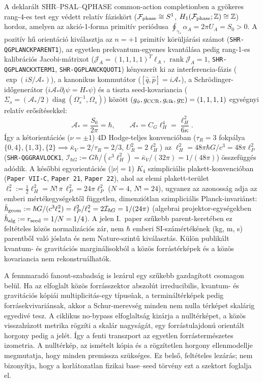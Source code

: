 \documentclass[12pt]{article}
\begin{document}
A deklarált SHR--PSAL--QPHASE common-action completionben a gyökeres rang-4-es
test egy védett relatív fáziskört ($\mathcal F_{\rm phase}\cong S^1$,
$H_1(\mathcal F_{\rm phase};\mathbb Z)\cong\mathbb Z$) hordoz, amelyen az
akció-1-forma primitív periódusa $\oint_{\gamma_*}\alpha_A=2\pi U_A=S_0>0$.
A pozitív hű orientáció kiválasztja az $n=+1$ primitív körüljárási számot
(\texttt{SHR-QGPLANCKPARENT1}), az egyetlen prekvantum-egyenes kvantálása pedig
rang-1-es kalibrációs Jacobi-mátrixot ($\mathcal J_A=(1,1,1,1)^T\ell_A$,
$\operatorname{rank}\mathcal J_A=1$, \texttt{SHR-QGPLANCKXTERM1},
\texttt{SHR-QGPLANCKQUOT1}) kényszerít ki az interferencia-fázis
($\exp(iS/\mathcal A_*)$), a kanonikus kommutátor ($[\hat q,\hat p]=i\mathcal A_*$),
a Schr\"odinger-időgenerátor ($i\mathcal A_*\partial_t\psi=H_*\psi$) és a tiszta
seed-kovariancia ($\Sigma_s=(\mathcal A_*/2)\operatorname{diag}(\Omega_s^{-1},\Omega_s)$)
között $(g_\phi,g_{\rm CCR},g_{\rm clk},g_\Sigma)=(1,1,1,1)$ egységnyi
relatív erősítésekkel:
\[
 \mathcal A_*=\frac{S_0}{2\pi}=\hbar,
 \qquad
 \mathcal A_*=C_G\ell_H^4=\frac{\ell_H^2}{6\kappa}.
\]
Így a kétorientációs ($\nu=\pm 1$) 4D Hodge-teljes konvencióban ($\tau_R=3$
fokpálya $\{0,4\},\{1,3\},\{2\}\implies\bar\kappa_V=2/\tau_R=2/3$,
$U_R^2=2\ell_H^2$) az $\ell_H^2=48\pi\hbar G/c^3=48\pi\ell_P^2$
(\texttt{SHR-QGGRAVLOCK1}, $\mathcal I_{\hbar G}:=G\hbar/(c^3\ell_H^2)=\bar\kappa_V/(32\pi)=1/(48\pi)$)
összefüggés adódik. A későbbi egyorientációs ($|\nu|=1$) $K_4$ szimpliciális
plakett-konvencióban (\texttt{Paper VII-C}, \texttt{Paper 21}, \texttt{Paper 22}),
ahol az elemi plakett-terület $\ell_*^2 := \frac{1}{2}\ell_H^2 = N!\,\pi\,\ell_P^2 = 24\pi\ell_P^2$
($N=4$, $N!=24$), ugyanez az azonosság adja az emberi mértékegységektől független,
dimenziótlan szimpliciális Planck-invariánst:
$\tilde\hbar_{\rm geom}:=\hbar G/(c^3\ell_*^2)=\ell_P^2/\ell_*^2=2\mathcal I_{\hbar G}=1/(24\pi)$
(algebrai projektor-egységekben $\tilde\hbar_{\rm alg}:=r_{\rm seed}=1/N=1/4$).
A jelen I.~paper szűkebb parent-keretében ez feltételes közös normalizációs zár,
nem $\hbar$ emberi SI-számértékének (kg, m, s) parentből való jóslata és nem
Nature-szintű kiválasztás.  Külön publikált kvantum- és gravitációs
marginálisokból a közös forrástérképek és a közös kovariancia nem
rekonstruálhatók.

A fennmaradó fanout-szabadság is lezárul egy szűkebb gazdagított csomagon
belül.  Ha az elfoglalt közös forrásszektor abszolút irreducibilis, kvantum-
és gravitációs kópiái multiplicitás-egy típusúak, a termináltérképek pedig
forrásekvivariánsak, akkor a Schur-merevség minden nem nulla térképet skalárig
egyedivé tesz.  A ciklikus no-bypass elfoglaltság kizárja a nulltérképet, a
közös visszahúzott metrika rögzíti a skalár nagyságát, egy forrástulajdonú
orientált horgony pedig a jelét.  Így a fenti transzport az egyetlen
forrástermészetes izometria.  A nulltérkép, az ismételt kópia és a rögzítetlen
horgony ellenmodellje megmutatja, hogy minden premissza szükséges.  Ez belső,
feltételes lezárás; nem bizonyítja, hogy a korlátozatlan fizikai base--seed
törvény ezt a szektort foglalja el.
\end{document}
